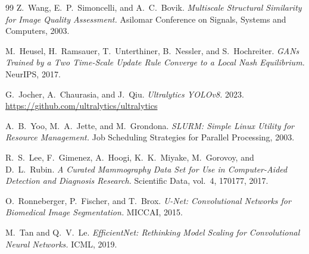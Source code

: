 \documentclass[11pt,a4paper,oneside]{report}
\begin{document}
\begin{thebibliography}{99}
Z.~Wang, E.~P.~Simoncelli, and A.~C.~Bovik.
\textit{Multiscale Structural Similarity for Image Quality Assessment.}
Asilomar Conference on Signals, Systems and Computers, 2003.

M.~Heusel, H.~Ramsauer, T.~Unterthiner, B.~Nessler, and S.~Hochreiter.
\textit{GANs Trained by a Two Time-Scale Update Rule Converge to a Local
Nash Equilibrium.} NeurIPS, 2017.

G.~Jocher, A.~Chaurasia, and J.~Qiu.
\textit{Ultralytics YOLOv8.} 2023. \url{https://github.com/ultralytics/ultralytics}

A.~B.~Yoo, M.~A.~Jette, and M.~Grondona.
\textit{SLURM: Simple Linux Utility for Resource Management.}
Job Scheduling Strategies for Parallel Processing, 2003.

R.~S.~Lee, F.~Gimenez, A.~Hoogi, K.~K.~Miyake, M.~Gorovoy, and D.~L.~Rubin.
\textit{A Curated Mammography Data Set for Use in Computer-Aided Detection
and Diagnosis Research.} Scientific Data, vol.~4, 170177, 2017.

O.~Ronneberger, P.~Fischer, and T.~Brox.
\textit{U-Net: Convolutional Networks for Biomedical Image Segmentation.}
MICCAI, 2015.

M.~Tan and Q.~V.~Le.
\textit{EfficientNet: Rethinking Model Scaling for Convolutional Neural
Networks.} ICML, 2019.

\end{thebibliography}
\end{document}
